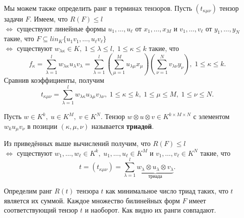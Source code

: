 Мы можем также определить ранг в терминах тензоров. Пусть $(t_{\kappa \mu \nu})$ тензор задачи $F$. Имеем, что $ R(F) \leq l$\\
$\Longleftrightarrow $ существуют линейные формы  $u_1, \ldots, u_\ell $ от $x_1, \ldots, x_M$  и $v_1, \ldots, v_\ell $  от $y_1, \ldots, y_N$  такие, что $F  \subseteq lin_K \{ u_1v_1 , \ldots, u_\ell v_\ell  \}$\\
$\Longleftrightarrow$ существуют $w_{\lambda \kappa} \in K,\; 1 \leq \lambda \leq l, \; 1 \leq \kappa \leq k$  такие, что 
\[
	f_\kappa = \sum\limits_{\lambda=1}^{l} w_{\lambda \kappa} u_\lambda v_\lambda = \sum\limits_{\lambda=1}^{l} \left( \sum\limits_{\mu=1}^{M} u_{\lambda \mu} x_\mu \right)\left( \sum\limits_{\nu=1}^{N} v_{\lambda \nu}y_\nu \right), \; 1 \leq \kappa \leq k.
\]
Сравнив коэффициенты, получим
\[
	t_{\kappa \mu \nu} = \sum\limits_{\lambda=1}^{l} w_{\lambda \kappa} u_{\lambda \mu} v_{\lambda \nu}, \; 1 \leq \kappa \leq k, \; 1 \leq \mu \leq M, \; 1 \leq \nu \leq N.
\]

\begin{definition}
  Пусть $w \in K^k,\; u \in K^M,\; v \in K^N$. Тензор $w \otimes u \otimes v \in K^{k \times M \times N}$ с элементом $w_k u_\mu v_\nu$ в позиции $(\kappa, \mu, \nu)$ называется \textbf{триадой}. 
\end{definition}

Из приведённых выше вычислений получим, что $R(F) \leq l$\\
$\Longleftrightarrow $ существуют $w_1, \ldots, w_\ell \in K^k, \; u_1, \ldots, u_\ell \in K^M$ и $v_1, \ldots, v_\ell \in K^N $ такие, что
\[
	t = (t_{\kappa \mu \nu}) = \sum\limits_{\lambda=1}^{l} \underbrace{w_\lambda \otimes u_\lambda \otimes v_\lambda}_\text{триада}.
\]

Определим  \label{def:tensor_rank} ранг $R(t)$ тензора $t$ как минимальное число триад таких, что $t$ является их суммой. Каждое множество билинейных форм $F$  имеет соответствующий тензор $t$ и наоборот. Как видно их ранги совпадают.

